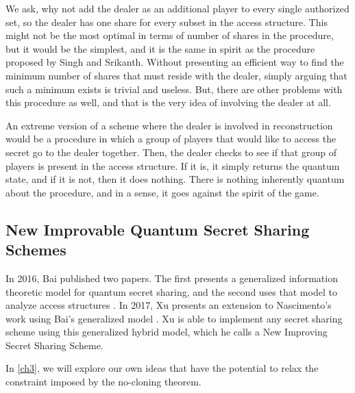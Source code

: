 We ask, why not add the dealer as an additional player to every single authorized set, so the dealer has one share for every subset in the access structure. This might not be the most optimal in terms of number of shares in the procedure, but it would be the simplest, and it is the same in spirit as the procedure proposed by Singh and Srikanth. Without presenting an efficient way to find the minimum number of shares that must reside with the dealer, simply arguing that such a minimum exists is trivial and useless. But, there are other problems with this procedure as well, and that is the very idea of involving the dealer at all.

An extreme version of a scheme where the dealer is involved in reconstruction would be a procedure in which a group of players that would like to access the secret go to the dealer together. Then, the dealer checks to see if that group of players is present in the access structure. If it is, it simply returns the quantum state, and if it is not, then it does nothing. There is nothing inherently quantum about the procedure, and in a sense, it goes against the spirit of the game.

\subsection{New Improvable Quantum Secret Sharing Schemes}
\label{ssec:niqss}

In 2016, Bai published two papers. The first presents a generalized information theoretic model for quantum secret sharing, and the second uses that model to analyze access structures \cite{bai_generalized_2016} \cite{bai_quantum_2017}. In 2017, Xu presents an extension to Nascimento's \cite{nascimento_improving_2001} work using Bai's generalized model \cite{xu_new_2017}. Xu is able to implement any secret sharing scheme using this generalized hybrid model, which he calls a New Improving Secret Sharing Scheme. 

In \cref{ch3}, we will explore our own ideas that have the potential to relax the constraint imposed by the no-cloning theorem.

